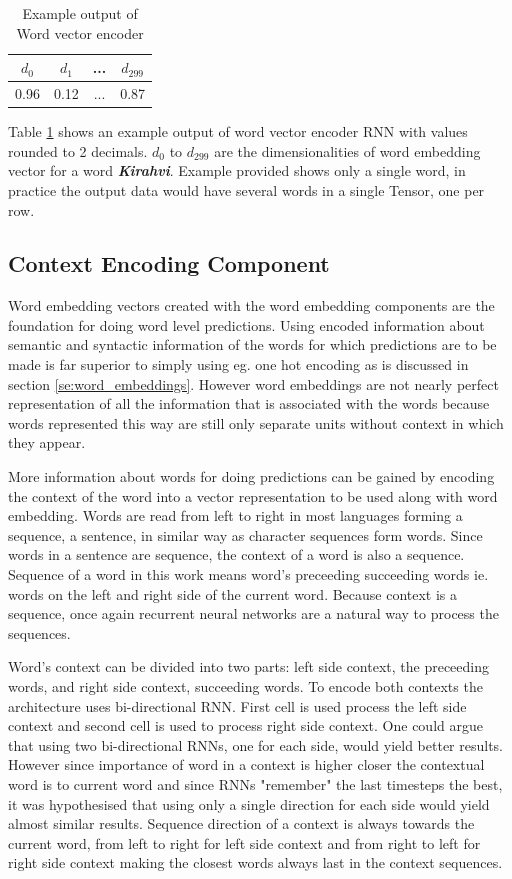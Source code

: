 \documentclass[12pt,a4paper,english
]{tutthesis}
\begin{document}
\begin{table}[htbp]
\caption{Example output of Word vector encoder}
\label{table:word_vector_encoder_output}
\centering
\begin{tabular}{|c|c|c|c|}
  \hline
  $d_0$ & $d_1$ & ... & $d_{299}$ \\
  \hline
  \hline
  0.96 & 0.12 & ... & 0.87 \\
  \hline
\end{tabular}
\end{table}

Table \ref{table:word_vector_encoder_output} shows an example output of word vector encoder RNN with values rounded to 2 decimals. $d_0$ to $d_{299}$ are the dimensionalities of word embedding vector for a word \textbf{\textit{Kirahvi}}. Example provided shows only a single word, in practice the output data would have several words in a single Tensor, one per row.


\subsection{Context Encoding Component}
\label{ss:context_encoding_component}
Word embedding vectors created with the word embedding components are the foundation for doing word level predictions. Using encoded information about semantic and syntactic information of the words for which predictions are to be made is far superior to simply using eg. one hot encoding as is discussed in section \ref{se:word_embeddings}. However word embeddings are not nearly perfect representation of all the information that is associated with the words because words represented this way are still only separate units without context in which they appear.

More information about words for doing predictions can be gained by encoding the context of the word into a vector representation to be used along with word embedding. Words are read from left to right in most languages forming a sequence, a sentence, in similar way as character sequences form words. Since words in a sentence are sequence, the context of a word is also a sequence. Sequence of a word in this work means word's preceeding succeeding words ie. words on the left and right side of the current word. Because context is a sequence, once again recurrent neural networks are a natural way to process the sequences.

Word's context can be divided into two parts: left side context, the preceeding words, and right side context, succeeding words. To encode both contexts the architecture uses bi-directional RNN. First cell is used process the left side context and second cell is used to process right side context. One could argue that using two bi-directional RNNs, one for each side, would yield better results. However since importance of word in a context is higher closer the contextual word is to current word and since RNNs "remember" the last timesteps the best, it was hypothesised that using only a single direction for each side would yield almost similar results. Sequence direction of a context is always towards the current word, from left to right for left side context and from right to left for right side context making the closest words always last in the context sequences.
\end{document}
